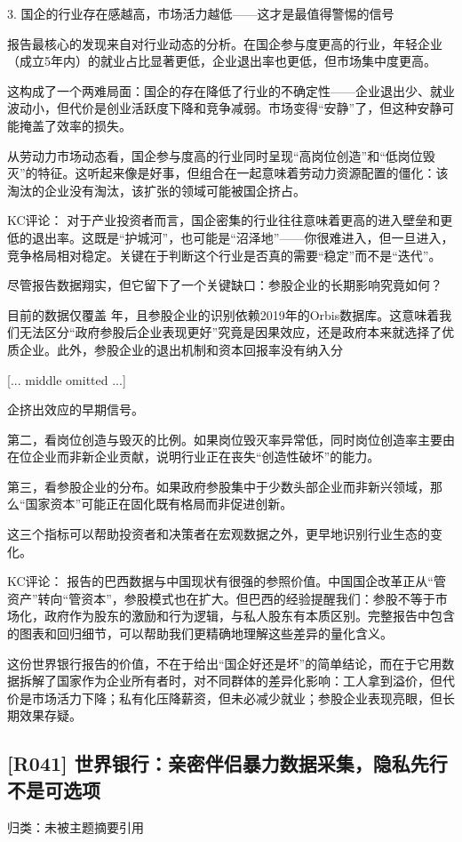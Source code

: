 \documentclass[11pt]{ctexart}
\begin{document}
3. 国企的行业存在感越高，市场活力越低——这才是最值得警惕的信号

报告最核心的发现来自对行业动态的分析。在国企参与度更高的行业，年轻企业（成立5年内）的就业占比显著更低，企业退出率也更低，但市场集中度更高。

这构成了一个两难局面：国企的存在降低了行业的不确定性——企业退出少、就业波动小，但代价是创业活跃度下降和竞争减弱。市场变得“安静”了，但这种安静可能掩盖了效率的损失。

从劳动力市场动态看，国企参与度高的行业同时呈现“高岗位创造”和“低岗位毁灭”的特征。这听起来像是好事，但组合在一起意味着劳动力资源配置的僵化：该淘汰的企业没有淘汰，该扩张的领域可能被国企挤占。

KC评论： 对于产业投资者而言，国企密集的行业往往意味着更高的进入壁垒和更低的退出率。这既是“护城河”，也可能是“沼泽地”——你很难进入，但一旦进入，竞争格局相对稳定。关键在于判断这个行业是否真的需要“稳定”而不是“迭代”。

尽管报告数据翔实，但它留下了一个关键缺口：参股企业的长期影响究竟如何？

目前的数据仅覆盖 年，且参股企业的识别依赖2019年的Orbis数据库。这意味着我们无法区分“政府参股后企业表现更好”究竟是因果效应，还是政府本来就选择了优质企业。此外，参股企业的退出机制和资本回报率没有纳入分

[... middle omitted ...]

企挤出效应的早期信号。

第二，看岗位创造与毁灭的比例。如果岗位毁灭率异常低，同时岗位创造率主要由在位企业而非新企业贡献，说明行业正在丧失“创造性破坏”的能力。

第三，看参股企业的分布。如果政府参股集中于少数头部企业而非新兴领域，那么“国家资本”可能正在固化既有格局而非促进创新。

这三个指标可以帮助投资者和决策者在宏观数据之外，更早地识别行业生态的变化。

KC评论： 报告的巴西数据与中国现状有很强的参照价值。中国国企改革正从“管资产”转向“管资本”，参股模式也在扩大。但巴西的经验提醒我们：参股不等于市场化，政府作为股东的激励和行为逻辑，与私人股东有本质区别。完整报告中包含的图表和回归细节，可以帮助我们更精确地理解这些差异的量化含义。

这份世界银行报告的价值，不在于给出“国企好还是坏”的简单结论，而在于它用数据拆解了国家作为企业所有者时，对不同群体的差异化影响：工人拿到溢价，但代价是市场活力下降；私有化压降薪资，但未必减少就业；参股企业表现亮眼，但长期效果存疑。

\subsection{[R041] 世界银行：亲密伴侣暴力数据采集，隐私先行不是可选项}
{\small\color{refgray}归类：未被主题摘要引用}
\end{document}
